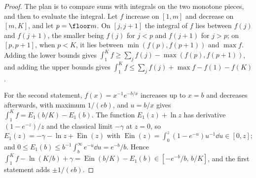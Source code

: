 \begin{refsection}

\begin{proof}
The plan is to compare sums with integrals on the two monotone pieces, and then to evaluate the integral. Let $f$ increase on $[1,m]$ and decrease on $[m,K]$, and let $p=\floor m$. On $[j,j+1]$ the integral of $f$ lies between $f(j)$ and $f(j+1)$, the smaller being $f(j)$ for $j<p$ and $f(j+1)$ for $j>p$; on $[p,p+1]$, when $p<K$, it lies between $\min(f(p),f(p+1))$ and $\max f$. Adding the lower bounds gives $\int_1^Kf\ge\sum_jf(j)-\max(f(p),f(p+1))$, and adding the upper bounds gives $\int_1^Kf\le\sum_jf(j)+\max f-f(1)-f(K)$.

For the second statement, $f(x)=x^{-1}e^{-b/x}$ increases up to $x=b$ and decreases afterwards, with maximum $1/(eb)$, and $u=b/x$ gives $\int_1^Kf=E_1(b/K)-E_1(b)$. The function $E_1(z)+\ln z$ has derivative $(1-e^{-z})/z$ and the classical limit $-\gamma$ at $z=0$, so $E_1(z)=-\gamma-\ln z+\operatorname{Ein}(z)$ with $\operatorname{Ein}(z)=\int_0^z(1-e^{-u})u^{-1}\dd u\in[0,z]$; and $0\le E_1(b)\le b^{-1}\int_b^\infty e^{-u}\dd u=e^{-b}/b$. Hence $\int_1^Kf-\ln(K/b)+\gamma=\operatorname{Ein}(b/K)-E_1(b)\in[-e^{-b}/b,\,b/K]$, and the first statement adds $\pm1/(eb)$.
\end{proof}


\end{refsection}
